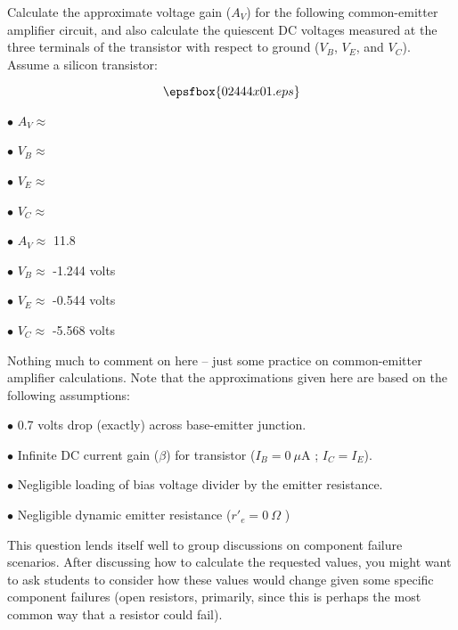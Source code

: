 

Calculate the approximate voltage gain ($A_V$) for the following common-emitter amplifier circuit, and also calculate the quiescent DC voltages measured at the three terminals of the transistor with respect to ground ($V_B$, $V_E$, and $V_C$).  Assume a silicon transistor:

$$\epsfbox{02444x01.eps}$$

\medskip
\goodbreak
\item{$\bullet$} $A_V \approx$ 
\item{$\bullet$} $V_B \approx$  
\item{$\bullet$} $V_E \approx$ 
\item{$\bullet$} $V_C \approx$ 
\medskip







\medskip
\goodbreak
\item{$\bullet$} $A_V \approx$ 11.8
\item{$\bullet$} $V_B \approx$ -1.244 volts
\item{$\bullet$} $V_E \approx$ -0.544 volts
\item{$\bullet$} $V_C \approx$ -5.568 volts
\medskip







Nothing much to comment on here -- just some practice on common-emitter amplifier calculations.  Note that the approximations given here are based on the following assumptions:

\medskip
\goodbreak
\item{$\bullet$} 0.7 volts drop (exactly) across base-emitter junction.
\item{$\bullet$} Infinite DC current gain ($\beta$) for transistor ($I_B = 0 \> \mu$A ; $I_C = I_E$).
\item{$\bullet$} Negligible loading of bias voltage divider by the emitter resistance.
\item{$\bullet$} Negligible dynamic emitter resistance ($r'_e = 0 \> \Omega$ )
\medskip

This question lends itself well to group discussions on component failure scenarios.  After discussing how to calculate the requested values, you might want to ask students to consider how these values would change given some specific component failures (open resistors, primarily, since this is perhaps the most common way that a resistor could fail).




